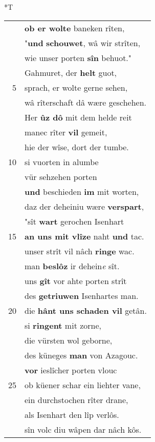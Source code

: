 \documentclass[8pt,a4paper,notitlepage]{article}
\begin{document}
\begin{table}[ht]
\begin{minipage}[t]{0.5\linewidth}
\end{minipage}
\hspace{0.5cm}
\begin{minipage}[t]{0.5\linewidth}
\small
\begin{center}*T
\end{center}
\begin{tabular}{rl}
 & \textbf{ob er wolte} baneken rîten,\\ 
 & "\textbf{und} \textbf{schouwet}, wâ wir strîten,\\ 
 & wie unser porten \textbf{sîn} behuot."\\ 
 & Gahmuret, der \textbf{helt} guot,\\ 
5 & sprach, er wolte gerne sehen,\\ 
 & wâ rîterschaft dâ wære geschehen.\\ 
 & Her \textbf{ûz dô} mit dem helde reit\\ 
 & manec rîter \textbf{vil} gemeit,\\ 
 & hie der wîse, dort der tumbe.\\ 
10 & si vuorten in alumbe\\ 
 & vür sehzehen porten\\ 
 & \textbf{und} beschieden \textbf{im} mit worten,\\ 
 & daz der deheiniu wære \textbf{verspart},\\ 
 & "sît \textbf{wart} gerochen Isenhart\\ 
15 & \textbf{an uns mit vlîze} naht \textbf{und} tac.\\ 
 & unser strît vil nâch \textbf{ringe} wac.\\ 
 & man \textbf{beslôz} ir dehein\textit{e} sît.\\ 
 & uns \textbf{gît} vor ahte porten strît\\ 
 & des \textbf{getriuwen} Isenhartes man.\\ 
20 & die \textbf{hânt uns schaden vil} getân.\\ 
 & si \textbf{ringent} mit zorne,\\ 
 & die vürsten wol geborne,\\ 
 & des küneges \textbf{man} von Azagouc.\\ 
 & \textbf{vor} ieslîcher porten vlouc\\ 
25 & ob küener schar ein liehter vane,\\ 
 & ein durchstochen rîter drane,\\ 
 & als Isenhart den lîp verlôs.\\ 
 & sîn volc diu wâpen dar nâch kôs.\\ 

\end{tabular}
\end{minipage}
\end{table}
\end{document}
